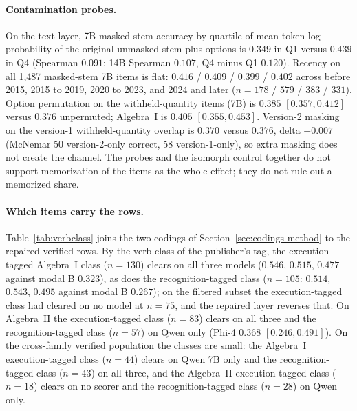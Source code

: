 \paragraph{Contamination probes.}
On the text layer, 7B masked-stem accuracy by quartile of mean token log-probability of the original unmasked stem plus options is $0.349$ in Q1 versus $0.439$ in Q4 (Spearman $0.091$; 14B Spearman $0.107$, Q4 minus Q1 $0.120$). Recency on all 1{,}487 masked-stem 7B items is flat: $0.416$ / $0.409$ / $0.399$ / $0.402$ across before 2015, 2015 to 2019, 2020 to 2023, and 2024 and later ($n=178$ / $579$ / $383$ / $331$). Option permutation on the withheld-quantity items (7B) is $0.385$ $[0.357, 0.412]$ versus $0.376$ unpermuted; Algebra~I is $0.405$ $[0.355, 0.453]$. Version-2 masking on the version-1 withheld-quantity overlap is $0.370$ versus $0.376$, delta $-0.007$ (McNemar 50 version-2-only correct, 58 version-1-only), so extra masking does not create the channel. The probes and the isomorph control together do not support memorization of the items as the whole effect; they do not rule out a memorized share.

\paragraph{Which items carry the rows.}
Table~\ref{tab:verbclass} joins the two codings of Section~\ref{sec:codings-method} to the repaired-verified rows. By the verb class of the publisher's tag, the execution-tagged Algebra~I class ($n=130$) clears on all three models ($0.546$, $0.515$, $0.477$ against modal B $0.323$), as does the recognition-tagged class ($n=105$: $0.514$, $0.543$, $0.495$ against modal B $0.267$); on the filtered subset the execution-tagged class had cleared on no model at $n=75$, and the repaired layer reverses that. On Algebra~II the execution-tagged class ($n=83$) clears on all three and the recognition-tagged class ($n=57$) on Qwen only (Phi-4 $0.368$ $[0.246, 0.491]$). On the cross-family verified population the classes are small: the Algebra~I execution-tagged class ($n=44$) clears on Qwen 7B only and the recognition-tagged class ($n=43$) on all three, and the Algebra~II execution-tagged class ($n=18$) clears on no scorer and the recognition-tagged class ($n=28$) on Qwen only.

